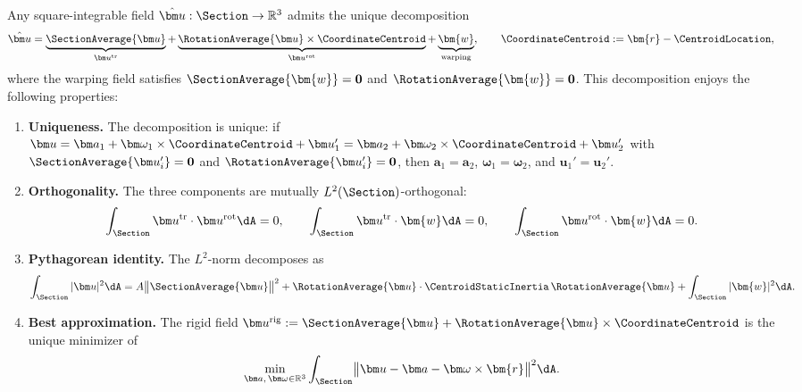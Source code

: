 
\begin{Details}

\begin{proposition}\label{cor:decomp-properties}
Any square-integrable field $\hat{\bm u} : \Section \to \mathbb{R}^3$ admits the unique decomposition
\begin{equation*}
    \hat{\bm u} = \underbrace{\SectionAverage{\bm u}}_{\bm u^{\mathrm{tr}}} 
          + \underbrace{\RotationAverage{\bm u} \times \CoordinateCentroid}_{\bm u^{\mathrm{rot}}} 
          + \underbrace{\bm{w}}_{\mathrm{warping}},
    \qquad
    \CoordinateCentroid := \bm{r} - \CentroidLocation,
\end{equation*}
where the warping field satisfies $\SectionAverage{\bm{w}} = \mathbf{0}$ and $\RotationAverage{\bm{w}} = \mathbf{0}$. This decomposition enjoys the following properties:

\begin{enumerate}[label=(\roman*)]
    \item \textbf{Uniqueness.} The decomposition is unique: if 
    $\bm u = \bm a_1 + \bm\omega_1 \times \CoordinateCentroid + \bm u_1' = \bm a_2 + \bm\omega_2 \times \CoordinateCentroid + \bm u_2'$
    with $\SectionAverage{\bm u_i'} = \mathbf{0}$ and $\RotationAverage{\bm u_i'} = \mathbf{0}$, then $\bm a_1 = \bm a_2$, $\bm\omega_1 = \bm\omega_2$, and $\bm u_1' = \bm u_2'$.

    \item \textbf{Orthogonality.} The three components are mutually $L^2(\Section)$-orthogonal:
    \begin{equation*}
        \int_{\Section} \bm u^{\mathrm{tr}} \cdot \bm u^{\mathrm{rot}} \dA = 0,
        \qquad
        \int_{\Section} \bm u^{\mathrm{tr}} \cdot \bm{w} \dA = 0,
        \qquad
        \int_{\Section} \bm u^{\mathrm{rot}} \cdot \bm{w} \dA = 0.
    \end{equation*}

    \item \textbf{Pythagorean identity.} The $L^2$-norm decomposes as
    \begin{equation*}
        \int_{\Section} |\bm u|^2 \dA 
        = A \bigl\|\SectionAverage{\bm u}\bigr\|^2 
        + \RotationAverage{\bm u} \cdot \CentroidStaticInertia \, \RotationAverage{\bm u} 
        + \int_{\Section} |\bm{w}|^2 \dA.
    \end{equation*}

    \item \textbf{Best approximation.} The rigid field $\bm u^{\mathrm{rig}} := \SectionAverage{\bm u} + \RotationAverage{\bm u} \times \CoordinateCentroid$ is the unique minimizer of
    \begin{equation*}
        \min_{\bm a,\, \bm\omega \in \mathbb{R}^3} \int_{\Section} \bigl\|\bm u - \bm a - \bm\omega \times \bm{r}\bigr\|^2 \dA.
    \end{equation*}


\end{enumerate}
\end{proposition}
\end{Details}
